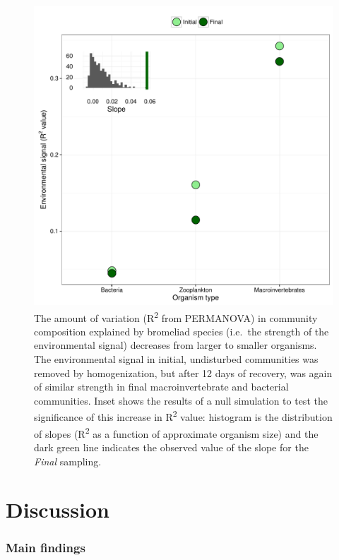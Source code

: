 \begin{figure}[htbp]
\centering
\includegraphics[width=5.5in]{figures/r2_plot.pdf}
\caption[Bromeliad species explains more variation in community composition in larger organisms.]{The amount of variation (R\textsuperscript{2} from PERMANOVA)
in community composition explained by bromeliad species (i.e.~the
strength of the environmental signal) decreases from larger to smaller
organisms. The environmental signal in initial, undisturbed communities
was removed by homogenization, but after 12 days of recovery, was again
of similar strength in final macroinvertebrate and bacterial
communities. Inset shows the results of a null simulation to test the
significance of this increase in R\textsuperscript{2} value: histogram
is the distribution of slopes (R\textsuperscript{2} as a function of
approximate organism size) and the dark green line indicates the
observed value of the slope for the \emph{Final} sampling.}
\label{fig:r2test}
\end{figure}

\section{Discussion}\label{discussion}

\subsubsection{Main findings}\label{main-findings}

